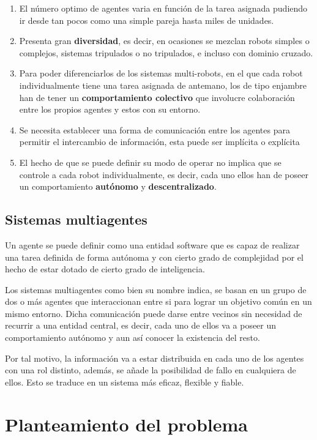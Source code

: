 \begin{enumerate}
	\item El número optimo de agentes varia en función de la tarea asignada pudiendo ir desde tan pocos como una simple pareja hasta miles de unidades.
	\item Presenta gran \textbf{diversidad}, es decir, en ocasiones se mezclan robots simples o complejos, sistemas tripulados o no tripulados, e incluso con dominio cruzado.
	\item Para poder diferenciarlos de los sistemas multi-robots, en el que cada robot individualmente tiene una tarea asignada de antemano, los de tipo enjambre han de tener un \textbf{comportamiento colectivo} que involucre colaboración entre los propios agentes y estos con su entorno.
	\item Se necesita establecer una forma de comunicación entre los agentes para permitir el intercambio de información, esta puede ser implícita o explícita
	\item El hecho de que se puede definir su modo de operar no implica que se controle a cada robot individualmente, es decir, cada uno ellos han de poseer un comportamiento \textbf{autónomo} y \textbf{descentralizado}.
\end{enumerate}


\subsection{Sistemas multiagentes}

Un agente se puede definir como una entidad software que es capaz de realizar una tarea definida de forma autónoma y con cierto grado de complejidad por el hecho de estar dotado de cierto grado de inteligencia.

Los sistemas multiagentes como bien su nombre indica, se basan en un grupo de dos o más agentes que interaccionan entre si para lograr un objetivo común en un mismo entorno. Dicha comunicación puede darse entre vecinos sin necesidad de recurrir a una entidad central, es decir, cada uno de ellos va a poseer un comportamiento autónomo y aun así conocer la existencia del resto.

Por tal motivo, la información va a estar distribuida en cada uno de los agentes con una rol distinto, además, se añade la posibilidad de fallo en cualquiera de ellos. Esto se traduce en un sistema más eficaz, flexible y fiable. 


\section{Planteamiento del problema}

